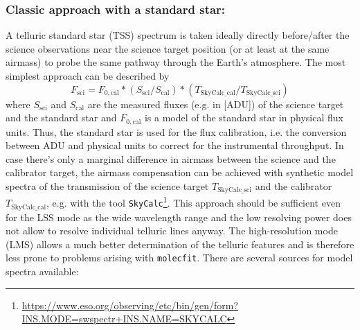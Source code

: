 \subsubsection{Classic approach with a standard star:}\label{sssec:tecllcorrclassic}
A telluric standard star (\ac{TSS}) spectrum is taken ideally directly before/after the science observations near the science target position (or at least at the same airmass) to probe the same pathway through the Earth's atmosphere. The most simplest approach can be described by
\begin{equation}
    F_\textrm{sci}=F_{0,\textrm{cal}}*\left(S_\textrm{sci}/S_\textrm{cal}\right)*\left(T_\textrm{SkyCalc\_cal} / T_\textrm{SkyCalc\_sci}\right)
\end{equation}
where $S_\textrm{sci}$ and $S_\textrm{cal}$ are the measured fluxes (e.g. in [\ac{ADU}]) of the science target and the standard star and $F_{0,\textrm{cal}}$ is a model of the standard star in physical flux units. Thus, the standard star is used for the flux calibration, i.e. the conversion between \ac{ADU} and physical units to correct for the instrumental throughput. In case there's only a marginal difference in airmass between the science and the calibrator target, the airmass compensation can be achieved with synthetic model spectra of the transmission of the science target $T_\textrm{SkyCalc\_sci}$ and the calibrator $T_\textrm{SkyCalc\_cal}$, e.g. with the tool \texttt{SkyCalc}\footnote{\url{https://www.eso.org/observing/etc/bin/gen/form?INS.MODE=swspectr+INS.NAME=SKYCALC}}. This approach should be sufficient even for the \ac{LSS} mode as the wide wavelength range and the low resolving power does not allow to resolve individual telluric lines anyway. The high-resolution mode (\ac{LMS}) allows a much better determination of the telluric features and is therefore less prone to problems arising with \texttt{molecfit}.
There are several sources for model spectra available:
